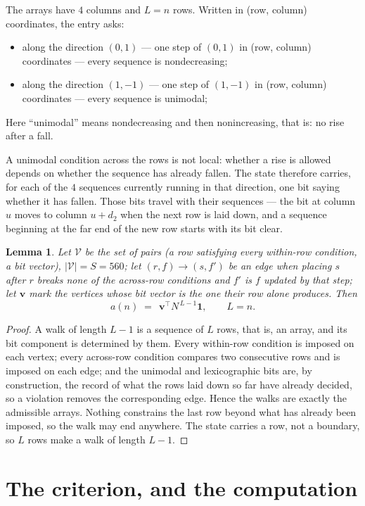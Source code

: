 \documentclass[11pt,a4paper]{article}
\theoremstyle{plain}
\newtheorem{lemma}[theorem]{Lemma}
\theoremstyle{definition}
\begin{document}
The arrays have $4$ columns and $L=n$ rows. Written in (row, column)
coordinates, the entry asks:
\begin{itemize}
\item along the direction $(0,1)$ --- one step of $(0,1)$ in (row, column) coordinates --- every sequence is nondecreasing;
\item along the direction $(1,-1)$ --- one step of $(1,-1)$ in (row, column) coordinates --- every sequence is unimodal;
\end{itemize}
Here ``unimodal'' means nondecreasing and then nonincreasing, that is: no rise after a fall.

A unimodal condition across the rows is not local: whether a
rise is allowed depends on whether the sequence has already fallen. The state therefore
carries, for each of the $4$ sequences currently running in that direction, one bit saying
whether it has fallen. Those bits travel with their sequences --- the bit at column $u$
moves to column $u+d_2$ when the next row is laid down, and a sequence beginning at the
far end of the new row starts with its bit clear.

\begin{lemma}\label{lem:walk}
Let $\mathcal V$ be the set of pairs (a row satisfying every within-row condition, a
bit vector), $|\mathcal V|=S=560$; let $(r,f)\to(s,f')$ be an edge when placing $s$ after $r$
breaks none of the across-row conditions and $f'$ is $f$ updated by that step; let
$\mathbf{v}$ mark the vertices whose bit vector is the one their row alone produces.
Then
\[
a(n)\;=\;\,\mathbf{v}^{\!\top}N^{\,L-1}\mathbf{1},\qquad L=n.
\]
\end{lemma}

\begin{proof}
A walk of length $L-1$ is a sequence of $L$ rows, that is, an array, and its bit component
is determined by them. Every within-row condition is imposed on each vertex; every
across-row condition compares two consecutive rows and is imposed on each edge; and the
unimodal and lexicographic bits are, by construction, the record of what the rows laid down
so far have already decided, so a violation removes the corresponding edge. Hence the walks
are exactly the admissible arrays. Nothing constrains the last row beyond what has already
been imposed, so the walk may end anywhere. The state carries a row, not a boundary, so
$L$ rows make a walk of length $L-1$.
\end{proof}

\section{The criterion, and the computation}
\end{document}
